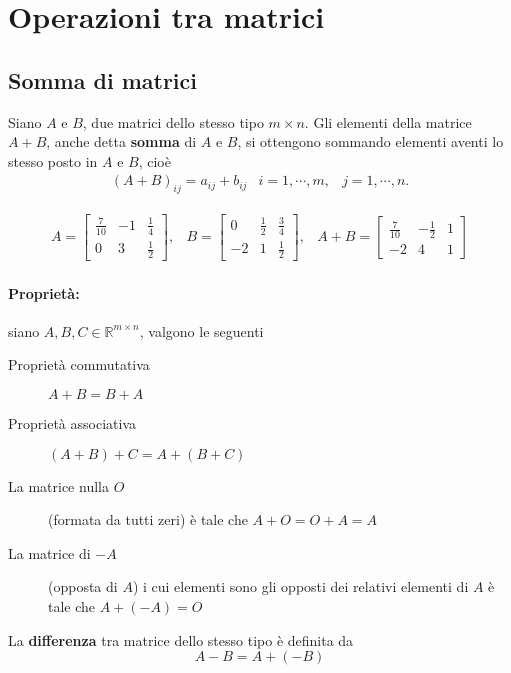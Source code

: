 \section{Operazioni tra matrici}
\label{sec:opmatrici}

\subsection{Somma di matrici}
\label{sec:somdimatrici}

Siano $A$ e $B$, due matrici dello stesso tipo $m\times n$. Gli elementi
della matrice $A+B$, anche detta \textbf{somma} di $A$ e $B$, si ottengono
sommando elementi aventi lo stesso posto in $A$ e $B$, cioè
\begin{eqnarray*}
  (A+B)_{ij}=a_{ij}+b_{ij} & i=1,\cdots,m, & j=1,\cdots,n.
\end{eqnarray*}
\begin{es}
  \label{es:sommatrice1}
  \begin{eqnarray*}
    A=
    \begin{bmatrix}
      \frac{7}{10} & -1 & \frac{1}{4}\\
      0 & 3 & \frac{1}{2}
    \end{bmatrix}, & B=
                    \begin{bmatrix}
                      0 & \frac{1}{2} & \frac{3}{4}\\
                      -2 & 1 & \frac{1}{2}
                    \end{bmatrix}, & A+B=
                                    \begin{bmatrix}
                                      \frac{7}{10} & -\frac{1}{2} & 1\\
                                      -2 & 4 & 1
                                    \end{bmatrix}
  \end{eqnarray*}
\end{es}

\paragraph{Proprietà:}

siano $A,B,C\in \mathds{R}^{m\times n}$, valgono le seguenti
\begin{description}
\item[Proprietà commutativa] $A+B=B+A$
\item[Proprietà associativa] $(A+B)+C=A+(B+C)$
\item[La matrice nulla $O$] (formata da tutti zeri) è tale che
  $A+O=O+A=A$ 
\item[La matrice di $-A$] (opposta di $A$) i cui elementi sono gli opposti
  dei relativi elementi di $A$ è tale che $A+(-A)=O$
\end{description}
La \textbf{differenza} tra matrice dello stesso tipo è definita da
\begin{equation*}
  A-B=A+(-B)
\end{equation*}

